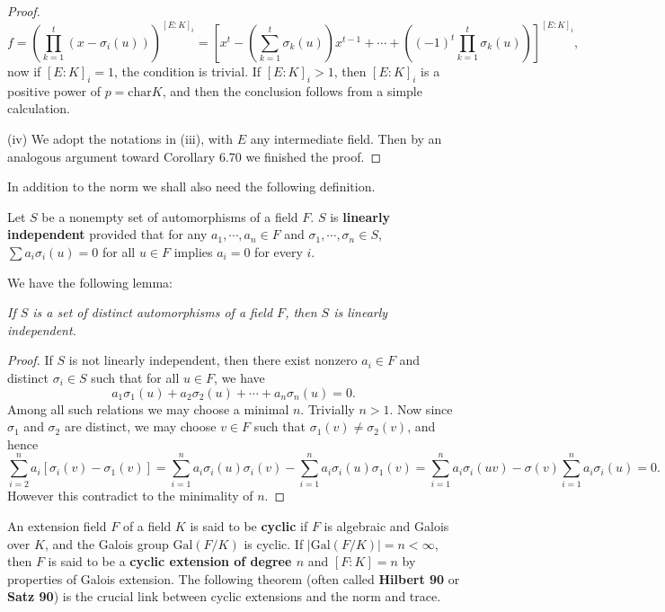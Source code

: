 \begin{proof}
$$
f=\left( \prod_{k=1}^t{\left( x-\sigma _i\left( u \right) \right)} \right) ^{\left[ E:K \right] _i}=\left[ x^t-\left( \sum_{k=1}^t{\sigma _k\left( u \right)} \right) x^{t-1}+\cdots +\left( \left( -1 \right) ^t\prod_{k=1}^t{\sigma _k\left( u \right)} \right) \right] ^{\left[ E:K \right] _i},
$$
now if $[E:K]_i=1$, the condition is trivial. If $[E:K]_i>1$, then $[E:K]_i$ is a positive power of $p=\mathrm{char}K$, and then the conclusion follows from a simple calculation.\par
(iv) We adopt the notations in (iii), with $E$ any intermediate field. Then by an analogous argument toward Corollary 6.70 we finished the proof.
\end{proof}
In addition to the norm we shall also need the following definition.
\begin{definition}
Let $S$ be a nonempty set of automorphisms of a field $F$. $S$ is \textbf{linearly independent} provided that for any $a_1,\cdots,a_n\in F$ and $\sigma_1,\cdots,\sigma_n\in S$, $\sum a_i\sigma_i(u)=0$ for all $u\in F$ implies $a_i=0$ for every $i$.
\end{definition}
We have the following lemma: 
\begin{lemma}\em
If $S$ is a set of distinct automorphisms of a field $F$, then $S$ is linearly independent.
\end{lemma}
\begin{proof}
If $S$ is not linearly independent, then there exist nonzero $a_i\in F$ and distinct $\sigma_i\in S$ such that for all $u\in F$, we have 
$$
a_1\sigma _1\left( u \right) +a_2\sigma _2\left( u \right) +\cdots +a_n\sigma _n\left( u \right) =0.
$$
Among all such relations we may choose a minimal $n$. Trivially $n>1$. Now since $\sigma_1$ and $\sigma_2$ are distinct, we may choose $v\in F$ such that $\sigma_1(v)\ne\sigma_2(v)$, and hence 
$$
\sum_{i=2}^n{a_i\left[ \sigma _i\left( v \right) -\sigma _1\left( v \right) \right]}=\sum_{i=1}^n{a_i\sigma _i\left( u \right) \sigma _i\left( v \right)}-\sum_{i=1}^n{a_i\sigma _i\left( u \right) \sigma _1\left( v \right)}=\sum_{i=1}^n{a_i\sigma _i\left( uv \right)}-\sigma \left( v \right) \sum_{i=1}^n{a_i\sigma _i\left( u \right)}=0.
$$
However this contradict to the minimality of $n$.
\end{proof}
An extension field $F$ of a field $K$ is said to be \textbf{cyclic} if $F$ is algebraic and Galois over $K$, and the Galois group $\mathrm{Gal}(F/K)$ is cyclic. If $|\mathrm{Gal}(F/K)|=n<\infty$, then $F$ is said to be a \textbf{cyclic extension of degree $n$} and $[F:K]=n$ by properties of Galois extension. The following theorem (often called \textbf{Hilbert 90} or \textbf{Satz 90}) is the crucial link between cyclic extensions and the norm and trace.
